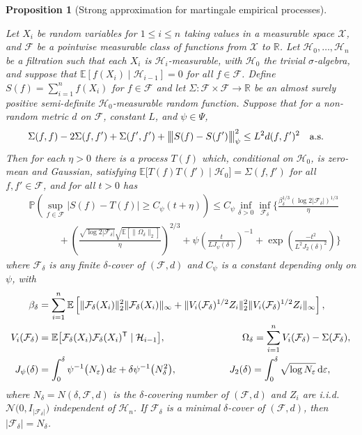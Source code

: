 \documentclass[11pt,lof]{puthesis}
\renewcommand{\P}{\ensuremath{\mathbb{P}}}
\newcommand{\R}{\ensuremath{\mathbb{R}}}
\newcommand{\E}{\ensuremath{\mathbb{E}}}
\newcommand{\cH}{\ensuremath{\mathcal{H}}}
\newcommand{\cF}{\ensuremath{\mathcal{F}}}
\newcommand{\cN}{\ensuremath{\mathcal{N}}}
\newcommand{\cX}{\ensuremath{\mathcal{X}}}
\newcommand{\T}{\ensuremath{\mathsf{T}}}
\newcommand{\bigvvvert}{{\big\vert\kern-0.35ex\big\vert\kern-0.35ex\big\vert}}
\newcommand{\diff}[1]{\,\mathrm{d}#1}
\theoremstyle{break}
\newtheorem{proposition}{Proposition}[section]
\theoremstyle{proof}
\begin{document}
\begin{proposition}[Strong approximation for martingale empirical processes]%
\label{pro:yurinskii_emp_proc}

Let $X_i$ be random variables for $1 \leq i \leq n$ taking values in a
measurable space $\cX$, and $\cF$ be a pointwise measurable class of
functions from $\cX$ to $\R$. Let $\cH_0, \ldots, \cH_n$ be a filtration such
that each $X_i$ is $\cH_i$-measurable, with $\cH_0$ the trivial
$\sigma$-algebra, and suppose that $\E[f(X_i) \mid \cH_{i-1}] = 0$ for all
$f \in \cF$. Define $S(f) = \sum_{i=1}^n f(X_i)$ for $f\in\cF$ and let
$\Sigma: \cF \times \cF \to \R$ be an almost surely positive semi-definite
$\cH_0$-measurable random function. Suppose that for a non-random
metric $d$ on $\cF$, constant $L$, and $\psi \in \Psi$,
%
\begin{align}%
\label{eq:yurinskii_emp_proc_var}
\Sigma(f,f) - 2\Sigma(f,f') + \Sigma(f',f')
+ \bigvvvert S(f) - S(f') \bigvvvert_\psi^2
&\leq L^2 d(f,f')^2 \quad \text{a.s.}
\end{align}
%
Then for each $\eta > 0$ there is a process $T(f)$
which, conditional on $\cH_0$, is zero-mean and Gaussian,
satisfying $\E\big[ T(f) T(f') \mid \cH_0 \big] = \Sigma(f,f')$
for all $f, f' \in \cF$, and for all $t > 0$ has
%
\begin{align*}
&\P\left(
\sup_{f \in \cF}
\big| S(f) - T(f) \big|
\geq C_\psi(t + \eta)
\right)
\leq
C_\psi
\inf_{\delta > 0}
\inf_{\cF_\delta}
\Bigg\{
\frac{\beta_\delta^{1/3} (\log 2 |\cF_\delta|)^{1/3}}{\eta } \\
&\qquad\quad+
\left(\frac{\sqrt{\log 2 |\cF_\delta|}
\sqrt{\E\left[\|\Omega_\delta\|_2\right]}}{\eta }\right)^{2/3}
+ \psi\left(\frac{t}{L J_\psi(\delta)}\right)^{-1}
+ \exp\left(\frac{-t^2}{L^2 J_2(\delta)^2}\right)
\Bigg\}
\end{align*}
%
where $\cF_\delta$ is any finite $\delta$-cover of $(\cF,d)$
and $C_\psi$ is a constant depending only on $\psi$, with
%
\begin{align*}
\beta_\delta
&= \sum_{i=1}^n
\E\left[ \|\cF_\delta(X_i)\|^2_2\|\cF_\delta(X_i)\|_\infty
+ \|V_i(\cF_\delta)^{1/2}Z_i\|^2_2
\|V_i(\cF_\delta)^{1/2}Z_i\|_\infty \right], \\
V_i(\cF_\delta)
&=
\E\big[\cF_\delta(X_i) \cF_\delta(X_i)^\T \mid \cH_{i-1} \big],
\hspace*{27.7mm}
\Omega_\delta
=
\sum_{i=1}^n V_i(\cF_\delta) - \Sigma(\cF_\delta), \\
J_\psi(\delta)
&=
\int_0^\delta \psi^{-1}\big( N_\varepsilon \big)
\diff{\varepsilon}
+ \delta \psi^{-1} \big( N_\delta^2 \big),
\hspace*{19mm}
J_2(\delta)
= \int_0^\delta \sqrt{\log N_\varepsilon}
\diff{\varepsilon},
\end{align*}
%
where $N_\delta = N(\delta, \cF, d)$
is the $\delta$-covering number of $(\cF, d)$
and $Z_i$ are i.i.d.\ $\cN\big(0, I_{|\cF_\delta|}\big)$
independent of $\cH_n$.
If $\cF_\delta$ is a minimal $\delta$-cover
of $(\cF, d)$, then $|\cF_\delta| = N_\delta$.
\end{proposition}
\end{document}
